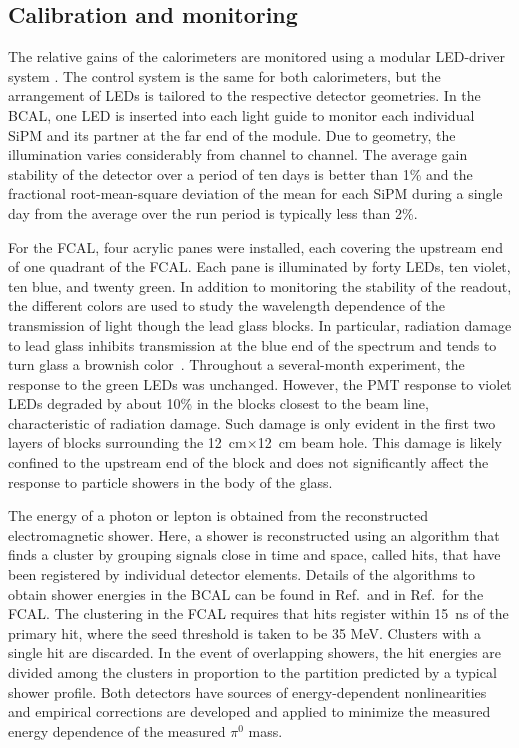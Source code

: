 \subsection[Calibration and monitoring]{Calibration and monitoring \label{sec:calcalib}}
The relative gains of the calorimeters are monitored using a modular LED-driver system \cite{Anassontzis201441}. The control system is the same for both calorimeters, but the arrangement of LEDs is tailored to the respective detector geometries. In the BCAL, one LED is inserted into each light guide to monitor each individual SiPM and its partner at the far end of the module.
Due to geometry, the illumination varies considerably from channel to channel. 
The average gain stability of the detector over a period of ten days is better than 1\% and the fractional root-mean-square deviation of the mean for each SiPM during a single day from the average over the run period is typically less than 2\%.

For the FCAL, four acrylic panes were installed, each covering the upstream end of one quadrant of the FCAL. Each pane is illuminated by forty LEDs, ten violet, ten blue, and twenty green. In addition to monitoring the stability of the readout, the different colors are used to study the wavelength dependence of the transmission of light though the lead glass blocks.  In particular, radiation damage to lead glass inhibits transmission at the blue end of the spectrum and tends to turn glass a brownish color~\cite{Schaefer:2011gw}. Throughout a several-month experiment, the response to the green LEDs was unchanged. However, the PMT response to violet LEDs degraded by about 10\% in the blocks closest to the beam line, characteristic of radiation damage.  Such damage is only evident in the first two layers of blocks surrounding the 12~cm$\times$12~cm beam hole. This damage is likely confined to the upstream end of the block and does not significantly affect the response to particle showers in the body of the glass.

The energy of a photon or lepton is obtained from the reconstructed electromagnetic shower. Here, a shower is reconstructed using an algorithm that finds a cluster by grouping signals close in time and space, called hits, that have been registered by individual detector elements.
Details of the algorithms to obtain shower energies in the BCAL can be found in Ref.\,\cite{BEATTIE201824}  and in Ref.\,\cite{Jones:2006ru} for the FCAL. The clustering in the FCAL requires that hits register within 15~ns of the primary hit, where the seed threshold is taken to be 35 MeV. Clusters with a single hit are discarded. In the event of overlapping showers, the hit energies are divided among the clusters in proportion to the partition predicted by a typical shower profile. Both detectors have sources of energy-dependent nonlinearities and empirical corrections are developed and applied to minimize the measured energy dependence of the measured $\pi^0$ mass.  


